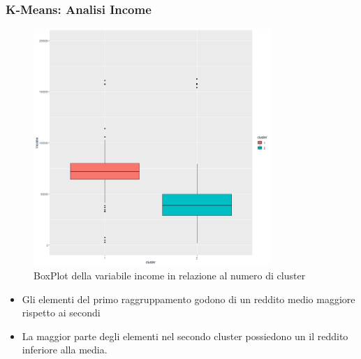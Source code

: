 \begin{frame}[fragile]
\frametitle{K-Means: Analisi Income}
\begin{minipage}{0.45\textwidth}
\begin{figure}[H]
        \centering
    \includegraphics[width=0.8\textwidth]{Img/KMEANS012.png}
    \caption{BoxPlot della variabile income in relazione al numero di cluster}
    \label{fig:incomeKmeansBoxPlot}
\end{figure}
\end{minipage}%
\hspace{2em}
\begin{minipage}{0.45\textwidth}
\begin{itemize}
    \item Gli elementi del primo raggruppamento godono di un reddito medio maggiore rispetto ai secondi
    \item La maggior parte degli elementi nel secondo cluster possiedono un il reddito inferiore alla media.
\end{itemize}
\end{minipage}%
\end{frame}

